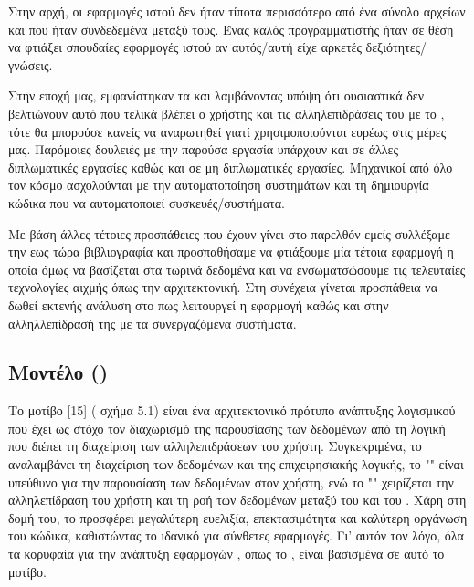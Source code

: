 Στην αρχή, οι εφαρμογές ιστού δεν ήταν τίποτα περισσότερο από ένα σύνολο αρχείων  και
 που ήταν συνδεδεμένα μεταξύ τους. Ένας καλός προγραμματιστής ήταν σε θέση να φτιάξει σπουδαίες εφαρμογές ιστού αν αυτός/αυτή
είχε αρκετές δεξιότητες/γνώσεις.

Στην εποχή μας, εμφανίστηκαν τα  και λαμβάνοντας υπόψη ότι ουσιαστικά δεν βελτιώνουν αυτό που τελικά βλέπει ο χρήστης και τις
αλληλεπιδράσεις του με το , τότε
θα μπορούσε κανείς να αναρωτηθεί γιατί χρησιμοποιούνται ευρέως στις μέρες μας.
Παρόμοιες δουλειές με την παρούσα εργασία υπάρχουν και σε άλλες διπλωματικές εργασίες καθώς και σε μη διπλωματικές εργασίες. Μηχανικοί από όλο τον κόσμο
ασχολούνται με την αυτοματοποίηση συστημάτων και τη δημιουργία κώδικα που να αυτοματοποιεί συσκευές/συστήματα. 

Με βάση άλλες τέτοιες προσπάθειες που έχουν γίνει στο παρελθόν εμείς συλλέξαμε την εως τώρα βιβλιογραφία
και προσπαθήσαμε να φτιάξουμε μία τέτοια εφαρμογή η οποία όμως να βασίζεται στα τωρινά δεδομένα και να 
ενσωματσώσουμε τις τελευταίες τεχνολογίες αιχμής όπως την  αρχιτεκτονική. Στη συνέχεια γίνεται προσπάθεια να δωθεί εκτενής
ανάλυση στο πως λειτουργεί η εφαρμογή καθώς και στην αλληλλεπίδρασή της με τα συνεργαζόμενα συστήματα. 
 
\subsection{Μοντέλο  ()}

Το μοτίβο [15] ( σχήμα 5.1) είναι ένα αρχιτεκτονικό πρότυπο ανάπτυξης λογισμικού που έχει ως στόχο τον διαχωρισμό της παρουσίασης των δεδομένων από τη λογική που διέπει τη διαχείριση των αλληλεπιδράσεων του χρήστη. Συγκεκριμένα, το  αναλαμβάνει τη διαχείριση των δεδομένων και της επιχειρησιακής λογικής, το "" είναι υπεύθυνο για την παρουσίαση των δεδομένων στον χρήστη, ενώ το "" χειρίζεται την αλληλεπίδραση του χρήστη και τη ροή των δεδομένων μεταξύ του  και του .
Χάρη στη δομή του, το  προσφέρει μεγαλύτερη ευελιξία, επεκτασιμότητα και καλύτερη οργάνωση του κώδικα, καθιστώντας το ιδανικό για σύνθετες εφαρμογές. Γι’ αυτόν τον λόγο, όλα τα κορυφαία  για την ανάπτυξη εφαρμογών , όπως το , είναι βασισμένα σε αυτό το μοτίβο.


